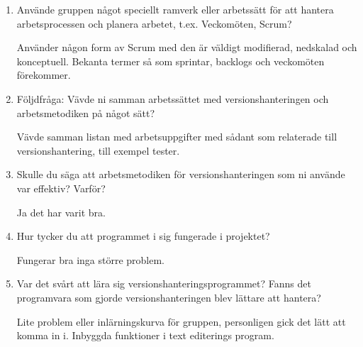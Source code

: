 \begin{enumerate}
  \item Använde gruppen något speciellt ramverk eller arbetssätt för att hantera arbetsprocessen och planera arbetet, t.ex. Veckomöten, Scrum?

  Använder någon form av Scrum med den är väldigt modifierad, nedskalad och konceptuell. Bekanta termer så som sprintar, backlogs och veckomöten förekommer.

  \item Följdfråga: Vävde ni samman arbetssättet med versionshanteringen och arbetsmetodiken på något sätt?

  Vävde samman listan med arbetsuppgifter med sådant som relaterade till versionshantering, till exempel tester.

  \item Skulle du säga att arbetsmetodiken för versionshanteringen som ni använde var effektiv? Varför?

  Ja det har varit bra.

  \item Hur tycker du att programmet i sig fungerade i projektet?

  Fungerar bra inga större problem.

  \item Var det svårt att lära sig versionshanteringsprogrammet? Fanns det programvara som gjorde versionshanteringen blev lättare att hantera?

  Lite problem eller inlärningskurva för gruppen, personligen gick det lätt att komma in i. Inbyggda funktioner i text editerings program.

\end{enumerate}

